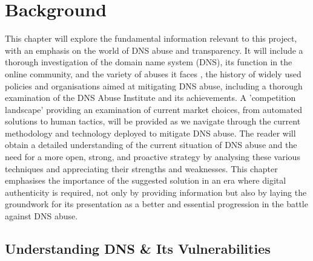 \chapter{Background}
\label{Chapt2}


This chapter will explore the fundamental information relevant to this project, with an emphasis on the world of DNS abuse and transparency. It will include a thorough investigation of the domain name system (DNS), its function in the online community, and the variety of abuses it faces , the history of widely used policies and organisations aimed at mitigating DNS abuse, including a thorough examination of the DNS Abuse Institute and its achievements. A 'competition landscape' providing an examination of current market choices, from automated solutions to human tactics, will be provided as we navigate through the current methodology and technology deployed to mitigate DNS abuse. The reader will obtain a detailed understanding of the current situation of DNS abuse and the need for a more open, strong, and proactive strategy by analysing these various techniques and appreciating their strengths and weaknesses. This chapter emphasises the importance of the suggested solution in an era where digital authenticity is required, not only by providing information but also by laying the groundwork for its presentation as a better and essential progression in the battle against DNS abuse.

\section{Understanding DNS \& Its Vulnerabilities}

